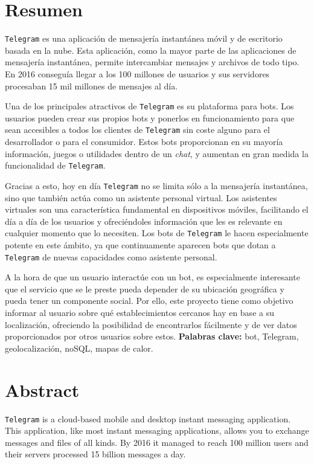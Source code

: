 \documentclass[oneside]{memoir}
\newcommand{\mychapter}[2]{
    \setcounter{chapter}{#1}
    \setcounter{section}{0}
    \chapter*{#2}
    \addcontentsline{toc}{chapter}{#2}
}
\begin{document}
\newpage
\mychapter{0}{Resumen}
\texttt{Telegram} es una aplicación de mensajería instantánea móvil y de escritorio basada en la nube. Esta aplicación, como la mayor parte de las aplicaciones de mensajería instantánea, permite intercambiar mensajes y archivos de todo tipo. En 2016 conseguía llegar a los 100 millones de usuarios y sus servidores procesaban 15 mil millones de mensajes al día.

Una de los principales atractivos de \texttt{Telegram} es su plataforma para bots. Los usuarios pueden crear sus propios bots y ponerlos en funcionamiento para que sean accesibles a todos los clientes de \texttt{Telegram} sin coste alguno para el desarrollador o para el consumidor. Estos bots proporcionan en su mayoría información, juegos o utilidades dentro de un \textit{chat}, y aumentan en gran medida la funcionalidad de \texttt{Telegram}. 

Gracias a esto, hoy en día \texttt{Telegram} no se limita sólo a la mensajería instantánea, sino que también actúa como un asistente personal virtual. Los asistentes virtuales son una característica fundamental en dispositivos móviles, facilitando el día a día de los usuarios y ofreciéndoles información que les es relevante en cualquier momento que lo necesiten. Los bots de \texttt{Telegram} le hacen especialmente potente en este ámbito, ya que continuamente aparecen bots que dotan a \texttt{Telegram} de nuevas capacidades como asistente personal.

A la hora de que un usuario interactúe con un bot, es especialmente interesante que el servicio que se le preste pueda depender de su ubicación geográfica y pueda tener un componente social. Por ello, este proyecto tiene como objetivo informar al usuario sobre qué establecimientos cercanos hay en base a su localización, ofreciendo la posibilidad de encontrarlos fácilmente y de ver datos proporcionados por otros usuarios sobre estos.
\bigbreak
{\Large\textbf{Palabras clave:} bot, Telegram, geolocalización, noSQL, mapas de calor.}

\newpage
\mychapter{0}{Abstract}
\texttt{Telegram} is a cloud-based mobile and desktop instant messaging application. This application, like most instant messaging applications, allows you to exchange messages and files of all kinds. By 2016 it managed to reach 100 million users and their servers processed 15 billion messages a day. %
\end{document}
